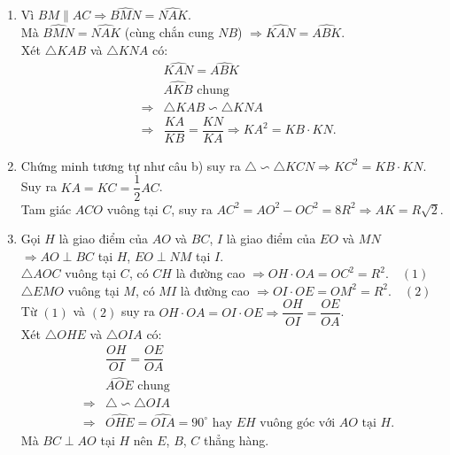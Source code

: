 \begin{ex}
{\begin{enumerate}
		\item 
		Vì $BM\parallel AC\Rightarrow \widehat{BMN}=\widehat{NAK}$.\\
		Mà $\widehat{BMN}=\widehat{NAK}$ (cùng chắn cung $NB$) $\Rightarrow \widehat{KAN}=\widehat{ABK}$.\\
		Xét $\triangle KAB$ và $\triangle KNA$ có: 
		\begin{eqnarray*}
			&&\widehat{KAN}=\widehat{ABK}\\
			&&\widehat{AKB} \text{ chung}\\
			&\Rightarrow& \triangle KAB\backsim \triangle KNA\\
			&\Rightarrow& \dfrac{KA}{KB}=\dfrac{KN}{KA}\Rightarrow KA^2=KB\cdot KN.
		\end{eqnarray*}	
	\item Chứng minh tương tự như câu b) suy ra $\triangle \backsim \triangle KCN\Rightarrow KC^2=KB\cdot KN$.\\
	Suy ra $KA=KC=\dfrac{1}{2}AC$.\\
	Tam giác $ACO$ vuông tại $C$, suy ra $AC^2=AO^2-OC^2=8R^2\Rightarrow AK=R\sqrt{2}$.
	\item Gọi $H$ là giao điểm của $AO$ và $BC$, $I$ là giao điểm của $EO$ và $MN$ $\Rightarrow AO\perp BC$ tại $H$, $EO\perp NM$ tại $I$.\\
	$\triangle AOC$ vuông tại $C$, có $CH$ là đường cao $\Rightarrow OH\cdot OA=OC^2=R^2.\quad (1)$\\
	$\triangle EMO$ vuông tại $M$, có $MI$ là đường cao $\Rightarrow OI\cdot OE=OM^2=R^2.\quad (2)$\\
	Từ $(1)$ và $(2)$ suy ra $OH\cdot OA=OI\cdot OE\Rightarrow \dfrac{OH}{OI}=\dfrac{OE}{OA}$.\\
	Xét $\triangle OHE$ và $\triangle OIA$ có: 
	\begin{eqnarray*}
	&&\dfrac{OH}{OI}=\dfrac{OE}{OA}\\
	&&\widehat{AOE} \text{ chung}\\
	&\Rightarrow& \triangle \backsim \triangle OIA\\
	&\Rightarrow& \widehat{OHE}=\widehat{OIA}=90^\circ \text{ hay $EH$ vuông góc với $AO$ tại $H$.}
	\end{eqnarray*}
Mà $BC\perp AO$ tại $H$ nên $E$, $B$, $C$ thẳng hàng.
	\end{enumerate}
}
\end{ex}
